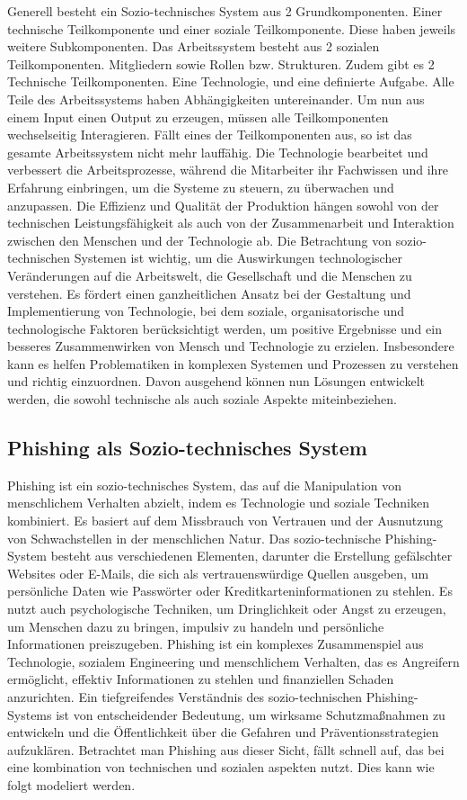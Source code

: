 \documentclass[journal=tosc,final]{iacrtrans}
\begin{document}
Generell besteht ein Sozio-technisches System aus 2 Grundkomponenten. Einer technische Teilkomponente und einer soziale Teilkomponente. Diese haben jeweils weitere Subkomponenten. Das Arbeitssystem besteht aus 2 sozialen Teilkomponenten. Mitgliedern sowie Rollen bzw. Strukturen. Zudem gibt es 2 Technische Teilkomponenten. Eine Technologie, und eine definierte Aufgabe. Alle Teile des Arbeitssystems haben Abhängigkeiten untereinander. Um nun aus einem Input einen Output zu erzeugen, müssen alle Teilkomponenten wechselseitig Interagieren. Fällt eines der Teilkomponenten aus, so ist das gesamte Arbeitssystem nicht mehr lauffähig. Die Technologie bearbeitet und verbessert die Arbeitsprozesse, während die Mitarbeiter ihr Fachwissen und ihre Erfahrung einbringen, um die Systeme zu steuern, zu überwachen und anzupassen. Die Effizienz und Qualität der Produktion hängen sowohl von der technischen Leistungsfähigkeit als auch von der Zusammenarbeit und Interaktion zwischen den Menschen und der Technologie ab. Die Betrachtung von sozio-technischen Systemen ist wichtig, um die Auswirkungen technologischer Veränderungen auf die Arbeitswelt, die Gesellschaft und die Menschen zu verstehen. Es fördert einen ganzheitlichen Ansatz bei der Gestaltung und Implementierung von Technologie, bei dem soziale, organisatorische und technologische Faktoren berücksichtigt werden, um positive Ergebnisse und ein besseres Zusammenwirken von Mensch und Technologie zu erzielen. Insbesondere kann es helfen Problematiken in komplexen Systemen und Prozessen zu verstehen und richtig einzuordnen. Davon ausgehend können nun Lösungen entwickelt werden, die sowohl technische als auch soziale Aspekte miteinbeziehen.  
\newpage
\subsection{Phishing als Sozio-technisches System}
Phishing ist ein sozio-technisches System, das auf die Manipulation von menschlichem Verhalten abzielt, indem es Technologie und soziale Techniken kombiniert. Es basiert auf dem Missbrauch von Vertrauen und der Ausnutzung von Schwachstellen in der menschlichen Natur. Das sozio-technische Phishing-System besteht aus verschiedenen Elementen, darunter die Erstellung gefälschter Websites oder E-Mails, die sich als vertrauenswürdige Quellen ausgeben, um persönliche Daten wie Passwörter oder Kreditkarteninformationen zu stehlen. Es nutzt auch psychologische Techniken, um Dringlichkeit oder Angst zu erzeugen, um Menschen dazu zu bringen, impulsiv zu handeln und persönliche Informationen preiszugeben. Phishing ist ein komplexes Zusammenspiel aus Technologie, sozialem Engineering und menschlichem Verhalten, das es Angreifern ermöglicht, effektiv Informationen zu stehlen und finanziellen Schaden anzurichten. Ein tiefgreifendes Verständnis des sozio-technischen Phishing-Systems ist von entscheidender Bedeutung, um wirksame Schutzmaßnahmen zu entwickeln und die Öffentlichkeit über die Gefahren und Präventionsstrategien aufzuklären.
Betrachtet man Phishing aus dieser Sicht, fällt schnell auf, das bei eine kombination von technischen und sozialen aspekten nutzt. Dies kann wie folgt modeliert werden. 
\end{document}
